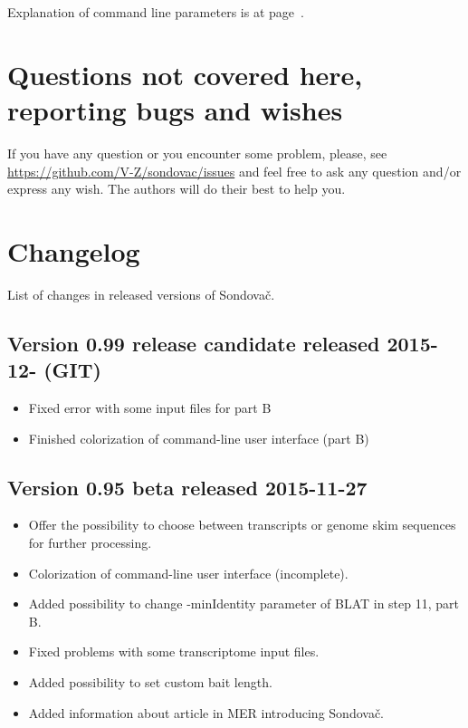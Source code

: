 \documentclass[a4paper, 11pt, twoside]{article}
\begin{document}
Explanation of command line parameters is at page~\pageref{script-usage}.

\section{Questions not covered here, reporting bugs and wishes}

If you have any question or you encounter some problem, please, see \href{https://github.com/V-Z/sondovac/issues}{https://github.com/V-Z/sondovac/issues} and feel free to ask any question and/or express any wish. The authors will do their best to help you.

\section{Changelog}

List of changes in released versions of Sondovač.

\subsection{Version 0.99 release candidate released 2015-12- (GIT)}

\begin{itemize}
  \item Fixed error with some input files for part B
  \item Finished colorization of command-line user interface (part B)
\end{itemize}

\subsection{Version 0.95 beta released 2015-11-27}

\begin{itemize}
  \item Offer the possibility to choose between transcripts or genome skim sequences for further processing.
  \item Colorization of command-line user interface (incomplete).
  \item Added possibility to change -minIdentity parameter of BLAT in step 11, part B.
  \item Fixed problems with some transcriptome input files.
  \item Added possibility to set custom bait length.
  \item Added information about article in MER introducing Sondovač.
\end{itemize}
\end{document}

